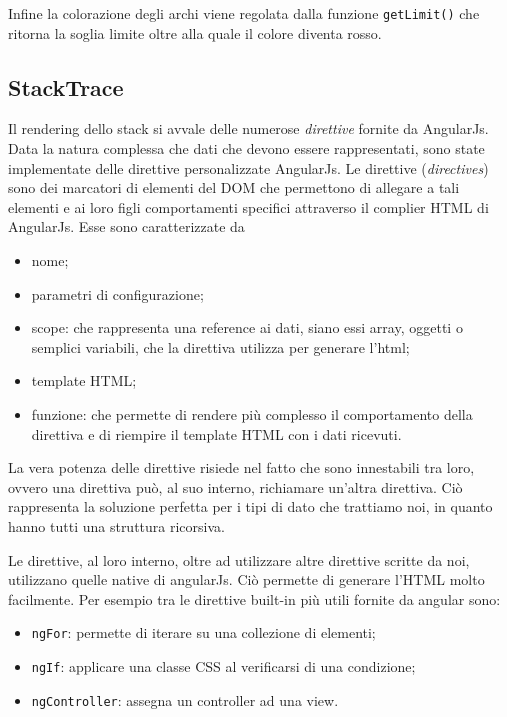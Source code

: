 Infine la colorazione degli archi viene regolata dalla funzione \texttt{getLimit()} che ritorna la soglia limite oltre alla quale il colore diventa rosso. 


\subsection{StackTrace} 
Il rendering dello stack si avvale delle numerose \emph{direttive} fornite da 
AngularJs. \\Data la natura complessa che dati che devono essere rappresentati, sono state 
implementate delle direttive personalizzate AngularJs. 
Le direttive (\emph{directives}) sono dei marcatori di elementi del DOM che permettono di allegare 
a tali elementi e ai loro figli comportamenti specifici attraverso il complier 
HTML di AngularJs. Esse sono  caratterizzate da 
\begin{itemize} 
	\item nome;
	\item parametri di configurazione;
	\item scope:  che rappresenta una reference ai dati, siano essi array, oggetti o 
	semplici variabili, che la direttiva utilizza per generare l'html;
	\item template HTML;
	\item funzione: che permette di rendere più complesso il comportamento della direttiva
	e di riempire il template HTML con i dati ricevuti.
\end{itemize} 

La vera potenza delle direttive risiede nel fatto che sono innestabili tra loro, 
ovvero una direttiva può, al suo interno, richiamare un'altra direttiva. Ciò 
rappresenta la soluzione perfetta per i tipi di dato che trattiamo noi, in quanto 
hanno tutti una struttura ricorsiva. 

Le direttive, al loro interno, oltre ad utilizzare altre direttive scritte da noi, 
utilizzano quelle native di angularJs. Ciò permette di generare l'HTML molto 
facilmente. Per esempio tra le direttive built-in più utili fornite da angular sono: 
\begin{itemize} 
	\item \texttt{ngFor}: permette di iterare su una collezione di elementi;
	\item \texttt{ngIf}: applicare una classe CSS al verificarsi di una condizione; 
	\item \texttt{ngController}: assegna un controller ad una view.
\end{itemize} 

